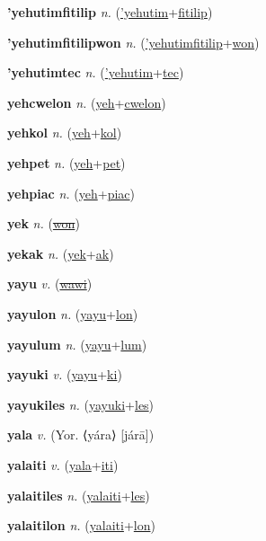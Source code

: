\textbf{\hypertarget{'yehutimfitilip}{'yehutimfitilip}} \textit{n.} (\hyperlink{'yehutim}{'yehutim}+\allowbreak \hyperlink{fitilip}{fitilip})


\textbf{\hypertarget{'yehutimfitilipwon}{'yehutimfitilipwon}} \textit{n.} (\hyperlink{'yehutimfitilip}{'yehutimfitilip}+\allowbreak \hyperlink{won}{won})


\textbf{\hypertarget{'yehutimtec}{'yehutimtec}} \textit{n.} (\hyperlink{'yehutim}{'yehutim}+\allowbreak \hyperlink{tec}{tec})


\textbf{\hypertarget{yehcwelon}{yehcwelon}} \textit{n.} (\hyperlink{yeh}{yeh}+\allowbreak \hyperlink{cwelon}{cwelon})


\textbf{\hypertarget{yehkol}{yehkol}} \textit{n.} (\hyperlink{yeh}{yeh}+\allowbreak \hyperlink{kol}{kol})


\textbf{\hypertarget{yehpet}{yehpet}} \textit{n.} (\hyperlink{yeh}{yeh}+\allowbreak \hyperlink{pet}{pet})


\textbf{\hypertarget{yehpiac}{yehpiac}} \textit{n.} (\hyperlink{yeh}{yeh}+\allowbreak \hyperlink{piac}{piac})


\textbf{\hypertarget{yek}{yek}} \textit{n.} (\hyperlink{won}{\sout{won}})


\textbf{\hypertarget{yekak}{yekak}} \textit{n.} (\hyperlink{yek}{yek}+\allowbreak \hyperlink{ak}{ak})


\textbf{\hypertarget{yayu}{yayu}} \textit{v.} (\hyperlink{wawi}{\sout{wawi}})


\textbf{\hypertarget{yayulon}{yayulon}} \textit{n.} (\hyperlink{yayu}{yayu}+\allowbreak \hyperlink{lon}{lon})


\textbf{\hypertarget{yayulum}{yayulum}} \textit{n.} (\hyperlink{yayu}{yayu}+\allowbreak \hyperlink{lum}{lum})


\textbf{\hypertarget{yayuki}{yayuki}} \textit{v.} (\hyperlink{yayu}{yayu}+\allowbreak \hyperlink{ki}{ki})


\textbf{\hypertarget{yayukiles}{yayukiles}} \textit{n.} (\hyperlink{yayuki}{yayuki}+\allowbreak \hyperlink{les}{les})


\textbf{\hypertarget{yala}{yala}} \textit{v.} (Yor. ⟨yára⟩ [járā])


\textbf{\hypertarget{yalaiti}{yalaiti}} \textit{v.} (\hyperlink{yala}{yala}+\allowbreak \hyperlink{iti}{iti})


\textbf{\hypertarget{yalaitiles}{yalaitiles}} \textit{n.} (\hyperlink{yalaiti}{yalaiti}+\allowbreak \hyperlink{les}{les})


\textbf{\hypertarget{yalaitilon}{yalaitilon}} \textit{n.} (\hyperlink{yalaiti}{yalaiti}+\allowbreak \hyperlink{lon}{lon})


